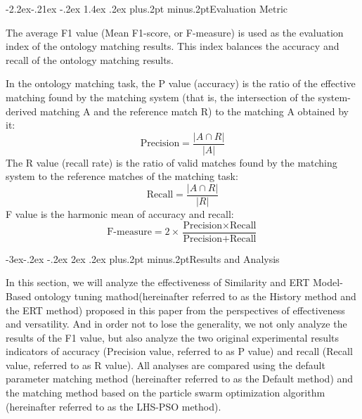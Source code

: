 \documentclass[twoside]{article}
\makeatletter
\def\subsection{\@startsection{subsection}{2}{\z@}%
 {-3ex\@plus -.2ex \@minus -.2ex}%
 {2ex \@plus.2ex}%
{\normalfont\normalsize\protect\baselineskip=12.5pt plus.2pt minus.2pt\bfseries}}
\def\subsubsection{\@startsection{subsubsection}{3}{\z@}%
 {-2.2ex\@plus -.21ex \@minus -.2ex}%
 {1.4ex \@plus.2ex}
{\normalfont\normalsize\protect\baselineskip=12pt plus.2pt minus.2pt\sl}}
\makeatother
\begin{document}
\subsubsection{Evaluation Metric}

The average F1 value (Mean F1-score, or F-measure)\cite{wwy59} is used as the evaluation index of the ontology matching results. This index balances the accuracy and recall of the ontology matching results.

In the ontology matching task, the P value (accuracy) is the ratio of the effective matching found by the matching system (that is, the intersection of the system-derived matching A and the reference match R) to the matching A obtained by it:
\begin{equation}
\text{Precision} = \frac{{\left| {A \cap R} \right|}}{{\left| A \right|}}
\end{equation}
The R value (recall rate) is the ratio of valid matches found by the matching system to the reference matches of the matching task:
\begin{equation}
\text{Recall} = \frac{{\left| {A \cap R} \right|}}{{\left| {R} \right|}}
\end{equation}
F value is the harmonic mean of accuracy and recall:
\begin{equation}
\text{F-measure} = {2}\times\frac{\text{Precision} \times \text{Recall}}{\text{Precision} + \text{Recall}}
\end{equation}

\subsection{Results and Analysis}

In this section, we will analyze the effectiveness of Similarity and ERT Model-Based ontology tuning mathod(hereinafter referred to as the History method and the ERT method) proposed in this paper from the perspectives of effectiveness and versatility.
And in order not to lose the generality, we not only analyze the results of the F1 value, but also analyze the two original experimental results indicators of accuracy (Precision value, referred to as P value) and recall (Recall value, referred to as R value).
All analyses are compared using the default parameter matching method (hereinafter referred to as the Default method) and the matching method based on the particle swarm optimization algorithm (hereinafter referred to as the LHS-PSO method).
\end{document}
